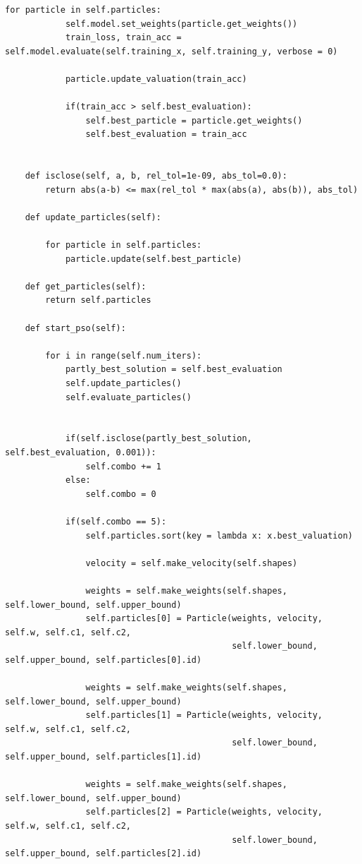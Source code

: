 \documentclass[a4paper]{article}
\begin{document}
\begin{lstlisting}[caption={Klasa korišćena za sam algoritam},frame=single, label=simple]
        for particle in self.particles:
            self.model.set_weights(particle.get_weights())
            train_loss, train_acc = self.model.evaluate(self.training_x, self.training_y, verbose = 0)
            
            particle.update_valuation(train_acc)
            
            if(train_acc > self.best_evaluation):
                self.best_particle = particle.get_weights()
                self.best_evaluation = train_acc
        
        
    def isclose(self, a, b, rel_tol=1e-09, abs_tol=0.0):
        return abs(a-b) <= max(rel_tol * max(abs(a), abs(b)), abs_tol)
    
    def update_particles(self):
        
        for particle in self.particles:
            particle.update(self.best_particle)
            
    def get_particles(self):
        return self.particles
    
    def start_pso(self):
        
        for i in range(self.num_iters):
            partly_best_solution = self.best_evaluation
            self.update_particles()
            self.evaluate_particles()
            
            
            if(self.isclose(partly_best_solution, self.best_evaluation, 0.001)):
                self.combo += 1
            else:
                self.combo = 0
                
            if(self.combo == 5):
                self.particles.sort(key = lambda x: x.best_valuation)
                
                velocity = self.make_velocity(self.shapes)
                
                weights = self.make_weights(self.shapes, self.lower_bound, self.upper_bound)
                self.particles[0] = Particle(weights, velocity, self.w, self.c1, self.c2, 
                                             self.lower_bound, self.upper_bound, self.particles[0].id)
                
                weights = self.make_weights(self.shapes, self.lower_bound, self.upper_bound)
                self.particles[1] = Particle(weights, velocity, self.w, self.c1, self.c2, 
                                             self.lower_bound, self.upper_bound, self.particles[1].id)
                
                weights = self.make_weights(self.shapes, self.lower_bound, self.upper_bound)
                self.particles[2] = Particle(weights, velocity, self.w, self.c1, self.c2, 
                                             self.lower_bound, self.upper_bound, self.particles[2].id)
                

\end{lstlisting}
\end{document}
